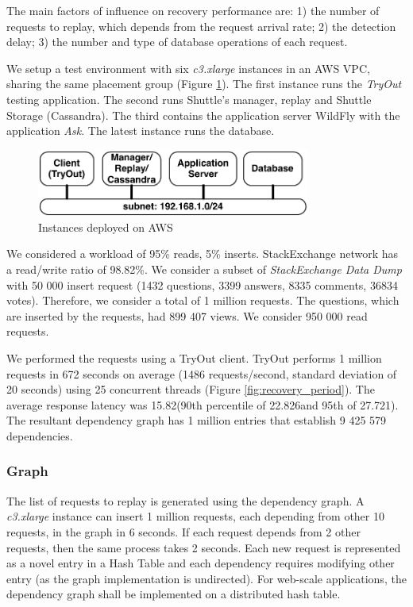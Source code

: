 The main factors of influence on recovery performance are: 1) the number of requests to replay, which depends from the request arrival rate; 2) the detection delay; 3) the number and type of database operations of each request.


We setup a test environment with six \emph{c3.xlarge} instances in an \ac{AWS} \acf{VPC}, sharing the same placement group (Figure \ref{fig:aws_diagram}). The first instance runs the \emph{TryOut} testing application. The second runs Shuttle's manager, replay and Shuttle Storage (Cassandra). The third contains the application server WildFly with the application \emph{Ask}. The latest instance runs the database.

\begin{figure}[!htb]
  \centering
  \includegraphics[width=90mm]{images/aws_diagram}
  \caption{Instances deployed on \ac{AWS} }
  \label{fig:aws_diagram}
\end{figure}


We considered a workload of 95\% reads, 5\% inserts. StackExchange network has a read/write ratio of 98.82\%. We consider a subset of \textit{StackExchange Data Dump} \cite{stackexchange_data} with 50 000 insert request (1432 questions, 3399 answers, 8335 comments, 36834 votes). Therefore, we consider a total of 1 million requests. The questions, which are inserted by the requests, had 899 407 views. We consider 950 000 read requests. 

We performed the requests using a TryOut client. TryOut performs 1 million requests in 672 seconds on average (1486 requests/second, standard deviation of 20 seconds) using 25 concurrent threads (Figure \ref{fig:recovery_period}). The average response latency was 15.82\ms (90th percentile of 22.826\ms and 95th of 27.721\ms). The resultant dependency graph has 1 million entries that establish 9 425 579 dependencies.\\



\subsubsection{Graph}\label{sec:eval:recovery:graph}
The list of requests to replay is generated using the dependency graph. A \emph{c3.xlarge} instance can insert 1 million requests, each depending from other 10 requests, in the graph in 6 seconds. If each request depends from 2 other requests, then the same process takes 2 seconds. Each new request is represented as a novel entry in a Hash Table and each dependency requires modifying other entry (as the graph implementation is undirected). For web-scale applications, the dependency graph shall be implemented on a distributed hash table.\\


